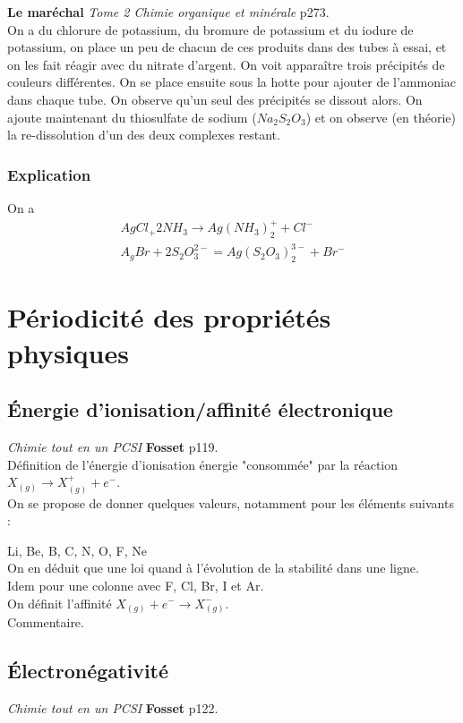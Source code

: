 \documentclass[12pt,prb,aps,epsf]{article}
\begin{document}
\textbf{Le maréchal} \textit{Tome 2 Chimie organique et minérale} p273.\\

On a du chlorure de potassium, du bromure de potassium et du iodure de potassium, on place un peu de chacun de ces produits dans des tubes à essai, et on les fait réagir avec du nitrate d'argent. On voit apparaître trois précipités de couleurs différentes. On se place ensuite sous la hotte pour ajouter de l'ammoniac dans chaque tube. On observe qu'un seul des précipités se dissout alors. On ajoute maintenant du thiosulfate de sodium ($Na_2S_2O_3$) et on observe (en théorie) la re-dissolution d'un des deux complexes restant.
\subsubsection{Explication}
On a 
\begin{eqnarray}
AgCl_ + 2NH_3 \longrightarrow Ag(NH_3)^+_2 + Cl^-\\
A_gBr + 2 S_2O_3^{2-} = Ag(S_2O_3)_2^{3-} + Br^-
\end{eqnarray}

\section{Périodicité des propriétés physiques}
\subsection{Énergie d'ionisation/affinité électronique}
\textit{Chimie tout en un PCSI} \textbf{Fosset} p119.\\

Définition de l'énergie d'ionisation énergie "consommée" par la réaction $X_{(g)} \rightarrow X^+_{(g)} + e^-$.\\
On se propose de donner quelques valeurs, notamment pour les éléments suivants :

Li, Be, B, C, N, O, F, Ne \\
On en déduit que une loi quand à l'évolution de la stabilité dans une ligne.\\
Idem pour une colonne avec F, Cl, Br, I et Ar.\\

On définit l'affinité $X_{(g)} +e^- \rightarrow X^-_{(g)}$.\\
Commentaire.

\subsection{Électronégativité}
\textit{Chimie tout en un PCSI} \textbf{Fosset} p122.\\
\end{document}

